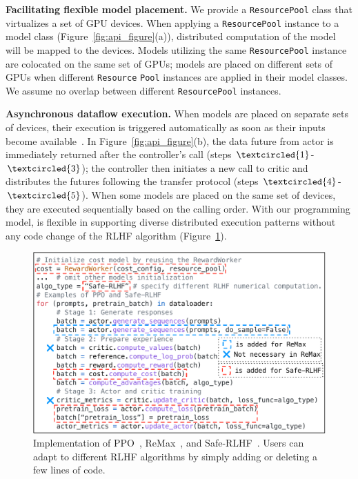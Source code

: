 \noindent\textbf{Facilitating flexible model placement.}
We provide a \verb|ResourcePool| class that virtualizes a set of GPU devices. 
When applying a \verb|ResourcePool| instance to a model class (Figure~\ref{fig:api_figure}(a)), distributed computation of the model will be mapped to the devices.
Models utilizing the same \verb|ResourcePool| instance are colocated on the same set of GPUs; %
models are placed on different sets of GPUs when different \verb|Resource| \verb|Pool| instances are applied in their model classes.
We assume no overlap between different \verb|ResourcePool| instances. 


\noindent\textbf{Asynchronous dataflow execution.}
When models are placed on separate sets of devices, their execution is triggered automatically %
as soon as their inputs become available~\cite {moritz2018ray}.
In Figure~\ref{fig:api_figure}(b), the data future from actor is immediately returned after the controller's call (steps $\textcircled{1}$-$\textcircled{3}$); the controller then initiates a new call to critic and distributes the futures following the %
transfer protocol (steps $\textcircled{4}$-$\textcircled{5}$). 
When some models are placed on the same set of devices, they are executed sequentially based on the calling order. %
With our programming model, \sysname{} is flexible in supporting diverse distributed execution patterns %
without any code change of the RLHF algorithm (Figure~\ref{fig:api_code}).











\begin{figure}[t]
    \includegraphics[width=\linewidth]{figs/fig_ppo_saferlhf_remax_test.pdf}
    \vspace{-7mm}
    \caption{Implementation of PPO~\cite{ouyang2022training}, ReMax~\cite{li2023remax}, and Safe-RLHF~\cite{daiSafeRLHFSafe2023}. Users can adapt to different RLHF algorithms by simply adding or deleting a few lines of code.}
    \label{fig:api_code}
    \vspace{-5mm}
\end{figure}

